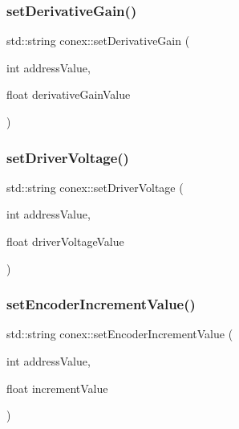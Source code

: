 \mbox{\label{namespaceconex_aa25149260c978531ca8f139da8b968b8}} 
\subsubsection{\texorpdfstring{set\+Derivative\+Gain()}{setDerivativeGain()}}
{\footnotesize\ttfamily std\+::string conex\+::set\+Derivative\+Gain (\begin{DoxyParamCaption}\item[{int}]{address\+Value,  }\item[{float}]{derivative\+Gain\+Value }\end{DoxyParamCaption})}

\mbox{\label{namespaceconex_a07def2519839ea99940a654201ff40b9}} 
\subsubsection{\texorpdfstring{set\+Driver\+Voltage()}{setDriverVoltage()}}
{\footnotesize\ttfamily std\+::string conex\+::set\+Driver\+Voltage (\begin{DoxyParamCaption}\item[{int}]{address\+Value,  }\item[{float}]{driver\+Voltage\+Value }\end{DoxyParamCaption})}

\mbox{\label{namespaceconex_a51a2f94e8cb024ecdc120c713dd19c7c}} 
\subsubsection{\texorpdfstring{set\+Encoder\+Increment\+Value()}{setEncoderIncrementValue()}}
{\footnotesize\ttfamily std\+::string conex\+::set\+Encoder\+Increment\+Value (\begin{DoxyParamCaption}\item[{int}]{address\+Value,  }\item[{float}]{increment\+Value }\end{DoxyParamCaption})}

